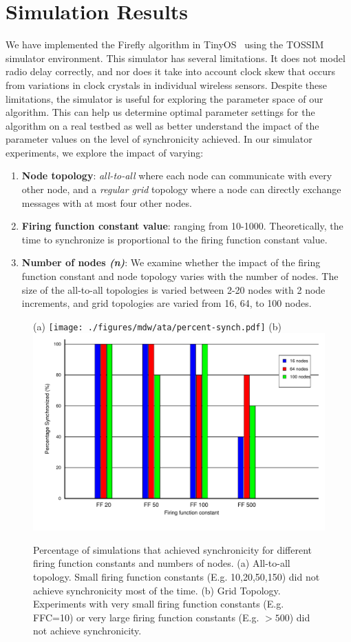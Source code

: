 \section{Simulation Results}
\label{sec-simulations}

We have implemented the Firefly algorithm in
TinyOS~\cite{tinyos-asplos00} using the TOSSIM~\cite{tossim} simulator
environment. This simulator has several limitations.  It does not
model radio delay correctly, and nor does it take into account clock
skew that occurs from variations in clock crystals in individual
wireless sensors. Despite these limitations, the simulator is useful
for exploring the parameter space of our algorithm.  This can help us
determine optimal parameter settings for the algorithm on a real
testbed as well as better understand the impact of the parameter
values on the level of synchronicity achieved. In our simulator
experiments, we explore the impact of varying:

\begin{enumerate}\addtolength{\itemsep}{-0.5\baselineskip}
\item {\bf Node topology}: \emph{all-to-all} where each node can
communicate with every other node, and a \emph{regular grid} topology
where a node can directly exchange messages with at most four other
nodes.
\item {\bf Firing function constant value}: ranging from
10-1000. Theoretically, the time to synchronize is proportional to the
firing function constant value.
\item {\bf Number of nodes {\em (n)}}: We examine whether the impact of the
firing function constant and node topology varies with the number of
nodes. The size of the all-to-all topologies is varied between 2-20
nodes with 2 node increments, and grid topologies are varied from 16,
64, to 100 nodes.
\end{enumerate}


\begin{figure}
\begin{center}
(a)
\texttt{[image: ./figures/mdw/ata/percent-synch.pdf]}
(b)
\includegraphics[width=0.4\hsize]{./figures/mdw/grid-synch/percent-synch-grid.pdf}
\end{center}
\caption{Percentage of simulations that achieved synchronicity for
different firing function constants and numbers of nodes. (a)
All-to-all topology. Small firing function constants
(E.g. 10,20,50,150) did not achieve synchronicity most of the
time. (b) Grid Topology. Experiments with very small firing function
constants (E.g. FFC=10) or very large firing function constants
(E.g. $>500$) did not achieve synchronicity.}
\label{fig:pcnt-synch-both}
\end{figure}

